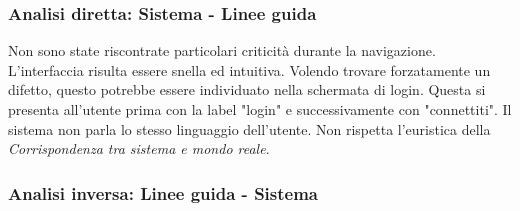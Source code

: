 \documentclass[12pt,italian,]{report}
\begin{document}
\subsubsection{Analisi diretta: Sistema - Linee
guida}\label{analisi-diretta-sistema---linee-guida}


Non sono state riscontrate particolari criticità durante la navigazione. L'interfaccia risulta essere snella ed intuitiva. Volendo trovare forzatamente un difetto, questo potrebbe essere individuato nella schermata di login. Questa si presenta all'utente prima con la label "login" e successivamente con "connettiti". Il sistema non parla lo stesso linguaggio dell'utente. Non rispetta l'euristica della \emph{Corrispondenza tra sistema e mondo reale}.



\hypertarget{analisi-inversa-linee-guida---sistema}{%
\subsubsection{Analisi inversa: Linee guida -
Sistema}\label{analisi-inversa-linee-guida---sistema}}
\end{document}
